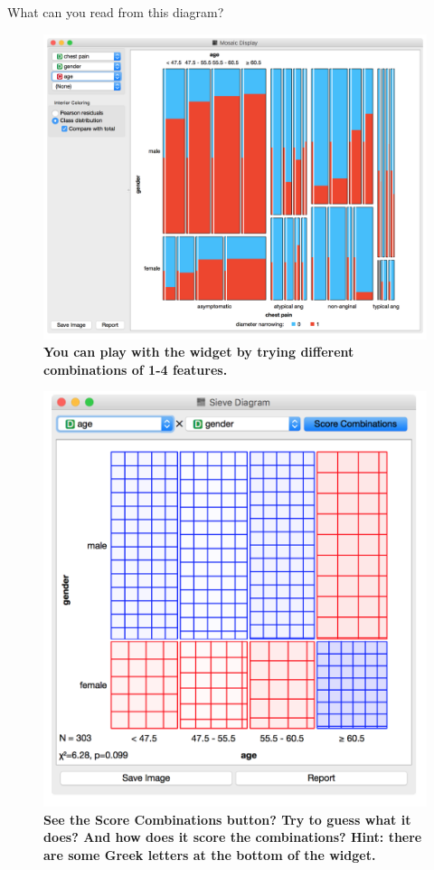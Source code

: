 \newpage
What can you read from this diagram?

\begin{figure}[h]
  \centering
  \includegraphics[width=\linewidth]{basic_data_exploration-fig6.png}
  \caption{\textbf{\textsf{You can play with the widget by trying different combinations of 1-4 features.}}}
  \label{fig:basic_data_exploration-fig6}
\end{figure}

\begin{figure}
  \includegraphics[scale=0.6]{basic_data_exploration-fig7.png}
  \caption{\textbf{\textsf{See the Score Combinations button? Try to guess what it does? And how does it score the combinations? Hint: there are some Greek letters at the bottom of the widget.}}}
\end{figure}

